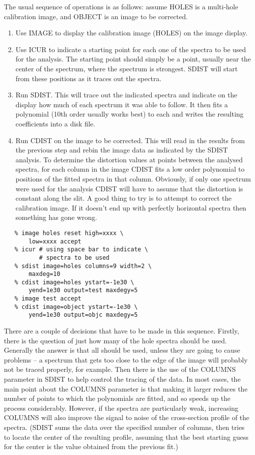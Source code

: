 The usual sequence of operations is as follows: assume HOLES is a
multi-hole calibration image, and OBJECT is an image to be corrected.

\begin{enumerate}
\item Use IMAGE to display the calibration image (HOLES) on the image 
   display.
\item Use ICUR to indicate
   a starting point for each one of 
   the spectra to be used for the analysis.  The starting point should simply
   be a point, usually near the center of the spectrum, where the spectrum is
   strongest.
   SDIST will start from these positions as it traces out the
   spectra.
\item Run SDIST.  This will trace out the indicated spectra and indicate
   on the display how much of each spectrum it was able to follow.  It then
   fits a polynomial (10th order usually works best) to each and writes the
   resulting coefficients into a disk file.
\item Run CDIST on the image to be corrected.  This will read in the
   results from the previous step and rebin the image data as indicated
   by the SDIST analysis.  To determine the distortion values at points
   between the analysed spectra, for each column in the image 
   CDIST fits a low order polynomial to positions of the fitted spectra in
   that column.  Obviously, if only one spectrum were used for the analysis
   CDIST will have to assume that the distortion is constant along the slit.
   A good thing to try is to attempt to correct the calibration image.  If it
   doesn't end up with perfectly horizontal spectra then something has gone 
   wrong.
\end{enumerate}

\begin{verbatim}
   % image holes reset high=xxxx \
       low=xxxx accept
   % icur # using space bar to indicate \
          # spectra to be used
   % sdist image=holes columns=9 width=2 \
       maxdeg=10
   % cdist image=holes ystart=-1e30 \
       yend=1e30 output=test maxdegy=5
   % image test accept
   % cdist image=object ystart=-1e30 \
       yend=1e30 output=objc maxdegy=5
\end{verbatim}

There are a couple of decisions that have to be made in this sequence.
Firstly, there is the question of just how many of the hole spectra should
be used.  Generally the answer is that all should be used, unless they are
going to cause problems -- a spectrum that gets too close to the edge of the
image will probably not be traced properly, for example.  Then there is the
use of the COLUMNS parameter in SDIST to help control the tracing of the data.
In most cases, the main point about the COLUMNS parameter is that making it
larger reduces the number of points to which the polynomials are fitted, and 
so speeds up the process considerably.  However, if the spectra are
particularly weak, increasing COLUMNS will also improve the signal to noise
of the cross-section profile of the spectra.  (SDIST sums 
the data over the
specified number of columns, then tries to locate the center of the resulting
profile, assuming that the best starting guess for the center is the value
obtained from the previous fit.)  

